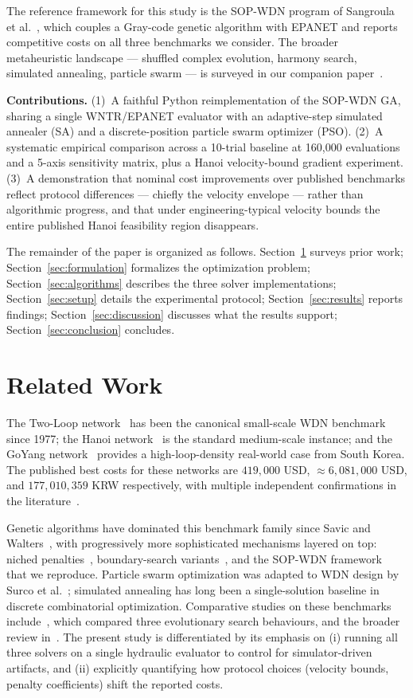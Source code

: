 \documentclass[conference]{IEEEtran}
\begin{document}
The reference framework for this study is the SOP-WDN program of Sangroula et al.~\cite{sangroula2022}, which couples a Gray-code genetic algorithm with EPANET and reports competitive costs on all three benchmarks we consider. The broader metaheuristic landscape --- shuffled complex evolution, harmony search, simulated annealing, particle swarm --- is surveyed in our companion paper~\cite{survey}.

\textbf{Contributions.} (1)~A faithful Python reimplementation of the SOP-WDN GA, sharing a single WNTR/EPANET evaluator with an adaptive-step simulated annealer (SA) and a discrete-position particle swarm optimizer (PSO). (2)~A systematic empirical comparison across a 10-trial baseline at 160{,}000 evaluations and a 5-axis sensitivity matrix, plus a Hanoi velocity-bound gradient experiment. (3)~A demonstration that nominal cost improvements over published benchmarks reflect protocol differences --- chiefly the velocity envelope --- rather than algorithmic progress, and that under engineering-typical velocity bounds the entire published Hanoi feasibility region disappears.

The remainder of the paper is organized as follows. Section~\ref{sec:related} surveys prior work; Section~\ref{sec:formulation} formalizes the optimization problem; Section~\ref{sec:algorithms} describes the three solver implementations; Section~\ref{sec:setup} details the experimental protocol; Section~\ref{sec:results} reports findings; Section~\ref{sec:discussion} discusses what the results support; Section~\ref{sec:conclusion} concludes.

\section{Related Work}
\label{sec:related}
The Two-Loop network~\cite{alperovits1977} has been the canonical small-scale WDN benchmark since 1977; the Hanoi network~\cite{fujiwara1990} is the standard medium-scale instance; and the GoYang network~\cite{kim1994} provides a high-loop-density real-world case from South Korea. The published best costs for these networks are $419{,}000$ USD, $\approx 6{,}081{,}000$ USD, and $177{,}010{,}359$ KRW respectively, with multiple independent confirmations in the literature~\cite{savic1997,geem2006}.

Genetic algorithms have dominated this benchmark family since Savic and Walters~\cite{savic1997}, with progressively more sophisticated mechanisms layered on top: niched penalties~\cite{deb1996}, boundary-search variants~\cite{wu2002}, and the SOP-WDN framework~\cite{sangroula2022} that we reproduce. Particle swarm optimization was adapted to WDN design by Surco et al.~\cite{surco2018}; simulated annealing has long been a single-solution baseline in discrete combinatorial optimization. Comparative studies on these benchmarks include~\cite{bi2020}, which compared three evolutionary search behaviours, and the broader review in~\cite{mala2018}. The present study is differentiated by its emphasis on (i) running all three solvers on a single hydraulic evaluator to control for simulator-driven artifacts, and (ii) explicitly quantifying how protocol choices (velocity bounds, penalty coefficients) shift the reported costs.
\end{document}
